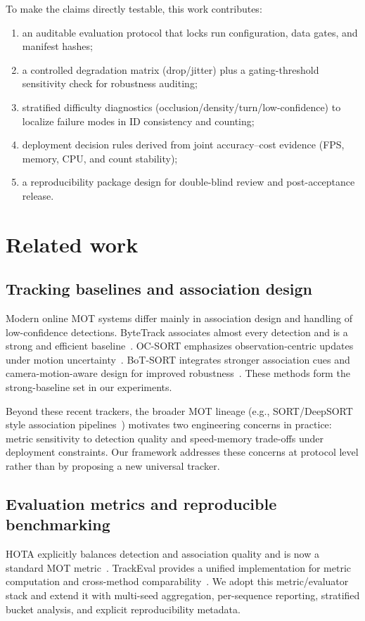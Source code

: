 \documentclass[preprint,12pt]{elsarticle}
\begin{document}
To make the claims directly testable, this work contributes:
\begin{enumerate}
  \item an auditable evaluation protocol that locks run configuration, data gates, and manifest hashes;
  \item a controlled degradation matrix (drop/jitter) plus a gating-threshold sensitivity check for robustness auditing;
  \item stratified difficulty diagnostics (occlusion/density/turn/low-confidence) to localize failure modes in ID consistency and counting;
  \item deployment decision rules derived from joint accuracy--cost evidence (FPS, memory, CPU, and count stability);
  \item a reproducibility package design for double-blind review and post-acceptance release.
\end{enumerate}

\section{Related work}
\subsection{Tracking baselines and association design}
Modern online MOT systems differ mainly in association design and handling of low-confidence detections. ByteTrack associates almost every detection and is a strong and efficient baseline~\cite{bytetrack2022}. OC-SORT emphasizes observation-centric updates under motion uncertainty~\cite{ocsort2022}. BoT-SORT integrates stronger association cues and camera-motion-aware design for improved robustness~\cite{botsort2022}. These methods form the strong-baseline set in our experiments.

Beyond these recent trackers, the broader MOT lineage (e.g., SORT/DeepSORT style association pipelines~\cite{sort2016,deepsort2017}) motivates two engineering concerns in practice: metric sensitivity to detection quality and speed-memory trade-offs under deployment constraints. Our framework addresses these concerns at protocol level rather than by proposing a new universal tracker.

\subsection{Evaluation metrics and reproducible benchmarking}
HOTA explicitly balances detection and association quality and is now a standard MOT metric~\cite{hota2020}. TrackEval provides a unified implementation for metric computation and cross-method comparability~\cite{trackeval2020}. We adopt this metric/evaluator stack and extend it with multi-seed aggregation, per-sequence reporting, stratified bucket analysis, and explicit reproducibility metadata.
\end{document}
